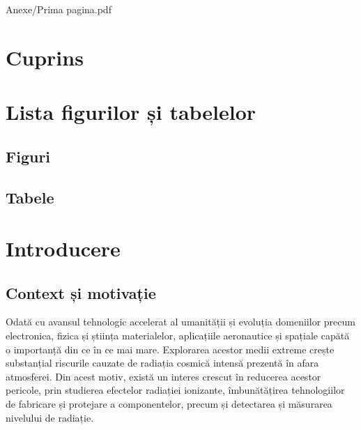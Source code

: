 \documentclass[12pt,a4paper]{report}
\begin{document}

{Anexe/Prima pagina.pdf}

\chapter*{Cuprins}
\vspace{-8em}
\tableofcontents
\newpage

\chapter*{Lista figurilor și tabelelor}

\section*{Figuri}
\vspace{-6em}
\listoffigures
\newpage

\section*{Tabele}
\vspace{-6em}
\listoftables
\newpage

\begingroup
\small
{}
\printglossary[type=acronym, style=list, nonumberlist, nogroupskip,title=Listă de acronime]
\endgroup
{}
\newpage

\chapter{Introducere}
\section{Context și motivație}
Odată cu avansul tehnologic accelerat al umanității și evoluția domeniilor precum electronica, fizica și știința materialelor, aplicațiile aeronautice și spațiale capătă o importanță din ce în ce mai mare. Explorarea acestor medii extreme crește substanțial riscurile cauzate de radiația cosmică intensă prezentă în afara atmosferei. Din acest motiv, există un interes crescut în reducerea acestor pericole, prin studierea efectelor radiației ionizante, îmbunătățirea tehnologiilor de fabricare și protejare a componentelor, precum și detectarea și măsurarea nivelului de radiație. 
\end{document}

